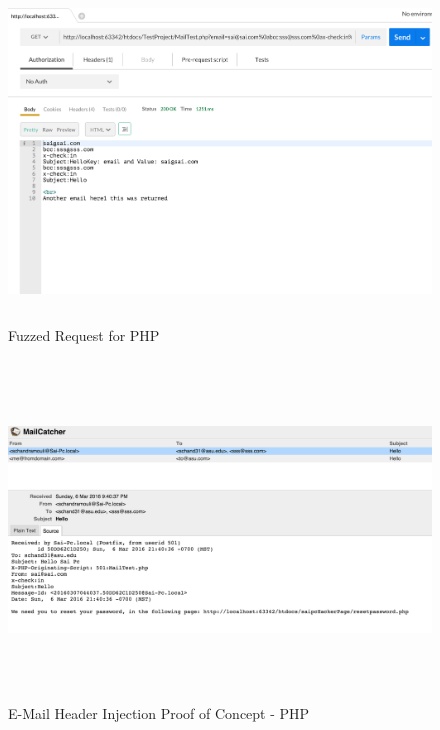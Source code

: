 \begin{figure}[!htbp]
	\centering
	\includegraphics[width=14cm, height=9cm]{System/EMI_Postman_PHP}
	\caption{Fuzzed Request for PHP}
	\label{fig:postmanphp}
\end{figure}

\begin{figure}[!htbp]
	\centering
	\includegraphics[width=14cm, height=9cm]{System/EMI_Mailcatcher_PHP}
	\caption{E-Mail Header Injection Proof of Concept - PHP}
	\label{fig:mailcatcherphp}
\end{figure}